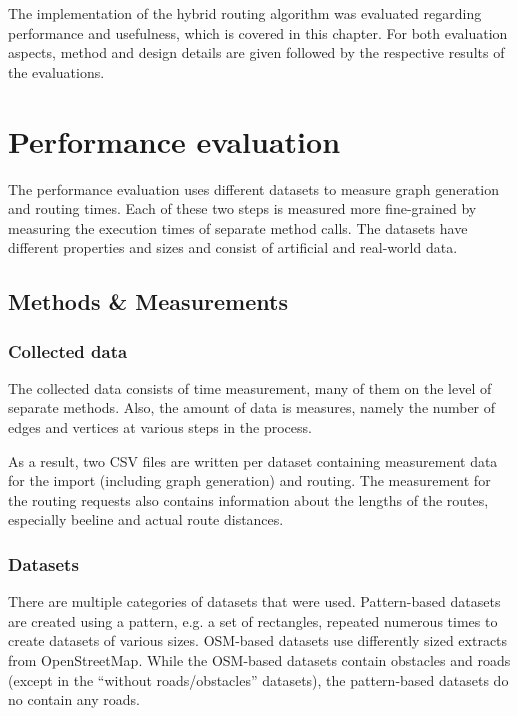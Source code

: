 
The implementation of the hybrid routing algorithm was evaluated regarding performance and usefulness, which is covered in this chapter.
For both evaluation aspects, method and design details are given followed by the respective results of the evaluations.

\section{Performance evaluation}

	The performance evaluation uses different datasets to measure graph generation and routing times.
	Each of these two steps is measured more fine-grained by measuring the execution times of separate method calls.
	The datasets have different properties and sizes and consist of artificial and real-world data.

	\subsection{Methods \& Measurements}

		\subsubsection{Collected data}
		
			The collected data consists of time measurement, many of them on the level of separate methods.
			Also, the amount of data is measures, namely the number of edges and vertices at various steps in the process.
			
			As a result, two CSV files are written per dataset containing measurement data for the import (including graph generation) and routing.
			The measurement for the routing requests also contains information about the lengths of the routes, especially beeline and actual route distances.
			
		
		\subsubsection{Datasets}
		
			There are multiple categories of datasets that were used.
			Pattern-based datasets are created using a pattern, e.g. a set of rectangles, repeated numerous times to create datasets of various sizes.
			OSM-based datasets use differently sized extracts from OpenStreetMap.
			While the OSM-based datasets contain obstacles and roads (except in the \enquote{without roads/obstacles} datasets), the pattern-based datasets do no contain any roads.
			
